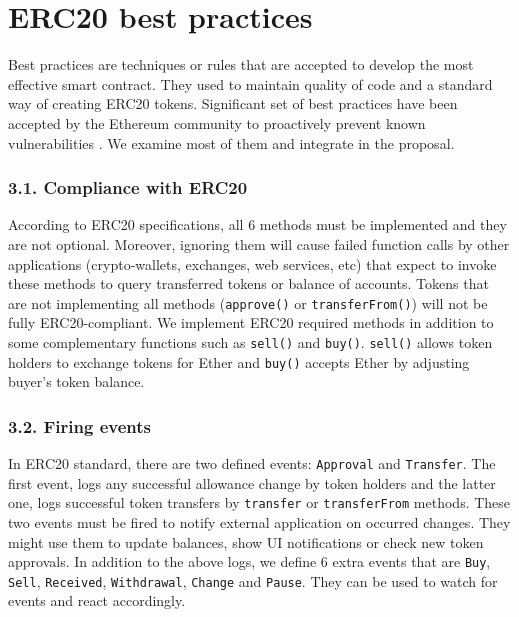 
\section{ERC20 best practices}\label{section:bp}
Best practices are techniques or rules that are accepted to develop the most effective smart contract. They used to maintain quality of code and a standard way of creating ERC20 tokens. Significant set of best practices have been accepted by the Ethereum community to proactively prevent known vulnerabilities \cite{TokenBP}. We examine most of them and integrate in the proposal.

\subsubsection*{3.1. Compliance with ERC20}
According to ERC20 specifications, all 6 methods must be implemented and they are not optional. Moreover, ignoring them will cause failed function calls by other applications (\ie crypto-wallets, exchanges, web services, etc) that expect to invoke these methods to query transferred tokens or balance of accounts. Tokens that are not implementing all methods (\eg \texttt{approve()} or \texttt{transferFrom()}) will not be fully ERC20-compliant. We implement ERC20 required methods in addition to some complementary functions such as \texttt{sell()} and \texttt{buy()}. \texttt{sell()} allows token holders to exchange tokens for Ether and \texttt{buy()} accepts Ether by adjusting buyer's token balance.

\subsubsection*{3.2. Firing events}
In ERC20 standard, there are two defined events: \texttt{Approval} and \texttt{Transfer}. The first event, logs any successful allowance change by token holders and the latter one, logs successful token transfers by \texttt{transfer} or \texttt{transferFrom} methods. These two events must be fired to notify external application on occurred changes. They might use them to update balances, show UI notifications or check new token approvals. In addition to the above logs, we define 6 extra events that are \texttt{Buy}, \texttt{Sell}, \texttt{Received}, \texttt{Withdrawal}, \texttt{Change} and \texttt{Pause}. They can be used to watch for events and react accordingly.

